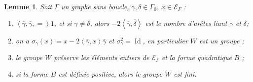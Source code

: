 \documentclass[a4paper,10pt]{article}
\newtheorem{lm}[]{Lemme}[section]
\DeclareMathOperator{\Id}{Id}
\newcommand{\ps}[2]{\left\langle#1,#2\right\rangle}
\newcommand{\EG}{\mathscr{E}_\Gamma}
\begin{document}
		\begin{lm}
			\label{elem}
		Soit $\Gamma$ un graphe sans boucle, $\gamma,\delta\in\Gamma_0$, $x\in\EG$ :
		\begin{enumerate}
			\item $\ps{\bar\gamma,\bar\gamma}=1$, et si $\gamma\neq\delta$, alors $-2\ps{\bar\gamma}{\bar\delta}$ est le nombre d'arêtes liant $\gamma$ et $\delta$;
			\item on a $\sigma_\gamma(x)=x-2\ps{\bar\gamma}{x}\bar\gamma$ et $\sigma_\gamma^2=\Id$, en particulier $W$ est un groupe ;
			\item le groupe $W$ préserve les éléments entiers de $\EG$ et la forme quadratique $B$ ;
			\item si la forme $B$ est définie positive, alors le groupe $W$ est fini.
		\end{enumerate}
\end{lm}
\end{document}
